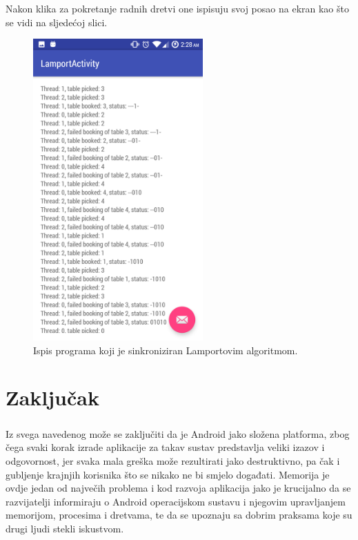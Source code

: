 \documentclass[times, utf8, zavrsni]{fer}
\begin{document}
Nakon klika za pokretanje radnih dretvi one ispisuju svoj posao na ekran kao što  se vidi na sljedećoj slici.

\begin{figure}[ht!]
\centering
\includegraphics[width=65mm]{img/LamportActivity.png}
\caption{Ispis programa koji je sinkroniziran Lamportovim algoritmom.}
\label{overflow}
\end{figure}

\chapter{Zaključak}
\paragraph{}
Iz svega navedenog može se zaključiti da je Android jako složena platforma, zbog čega svaki korak izrade aplikacije za takav sustav predstavlja veliki izazov i odgovornost, jer svaka mala greška može rezultirati jako destruktivno, pa čak i gubljenje krajnjih korisnika što se nikako ne bi smjelo događati. Memorija je ovdje jedan od največih problema i kod razvoja aplikacija jako je krucijalno da se razvijatelji informiraju o Android operacijskom sustavu i njegovim upravljanjem memorijom, procesima i dretvama, te da se upoznaju sa dobrim praksama koje su drugi ljudi stekli iskustvom.



\nocite{fer:zemris:os}
\nocite{android:dev:api:guide}
\nocite{android:dev:best:performance}
\nocite{android:dev:docs}
\nocite{wiki:dekker}
\nocite{wiki:lamport}
\nocite{wiki:paging}
\end{document}
